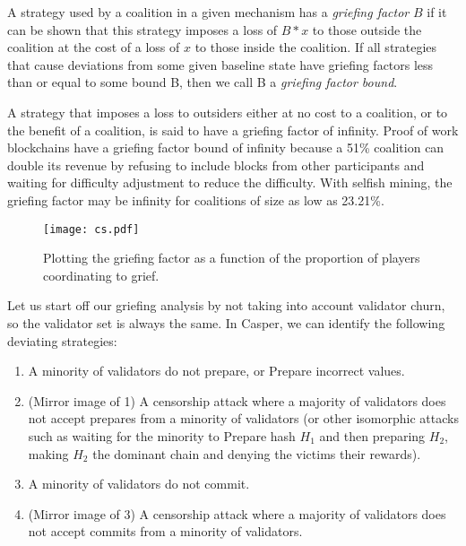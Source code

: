 \documentclass[12pt, final]{article}
\begin{document}
\begin{definition}
A strategy used by a coalition in a given mechanism has a \emph{griefing factor} $B$ if it can be shown that this strategy imposes a loss of $B * x$ to those outside the coalition at the cost of a loss of $x$ to those inside the coalition. If all strategies that cause deviations from some given baseline state have griefing factors less than or equal to some bound B, then we call B a \emph{griefing factor bound}. 
\end{definition}

A strategy that imposes a loss to outsiders either at no cost to a coalition, or to the benefit of a coalition, is said to have a griefing factor of infinity. Proof of work blockchains have a griefing factor bound of infinity because a 51\% coalition can double its revenue by refusing to include blocks from other participants and waiting for difficulty adjustment to reduce the difficulty. With selfish mining, the griefing factor may be infinity for coalitions of size as low as 23.21\%. \cite{selfishminingBTC}



\begin{figure}[h!bt]
	\centering
	\texttt{[image: cs.pdf]}
	\caption{Plotting the griefing factor as a function of the proportion of players coordinating to grief.}
	\label{fig:GF}
\end{figure}

Let us start off our griefing analysis by not taking into account validator churn, so the validator set is always the same. In Casper, we can identify the following deviating strategies:

\begin{enumerate}
\item A minority of validators do not prepare, or Prepare incorrect values.
\item (Mirror image of 1) A censorship attack where a majority of validators does not accept prepares from a minority of validators (or other isomorphic attacks such as waiting for the minority to Prepare hash $H_1$ and then preparing $H_2$, making $H_2$ the dominant chain and denying the victims their rewards).
\item A minority of validators do not commit.
\item (Mirror image of 3) A censorship attack where a majority of validators does not accept commits from a minority of validators.
\end{enumerate}
\end{document}
